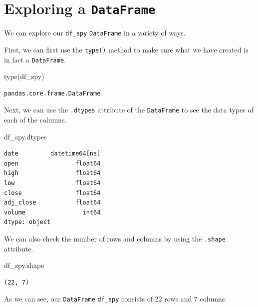 \documentclass[
  letterpaper,
  DIV=11,
  numbers=noendperiod]{scrreprt}
\newenvironment{Shaded}{\begin{snugshade}}{\end{snugshade}}
\newcommand{\BuiltInTok}[1]{\textcolor[rgb]{0.00,0.23,0.31}{#1}}
\newcommand{\NormalTok}[1]{\textcolor[rgb]{0.00,0.23,0.31}{#1}}
\begin{document}
\hypertarget{exploring-a-dataframe}{%
\section{\texorpdfstring{Exploring a
\texttt{DataFrame}}{Exploring a DataFrame}}\label{exploring-a-dataframe}}

We can explore our \texttt{df\_spy} \texttt{DataFrame} in a variety of
ways.

First, we can first use the \texttt{type()} method to make sure what we
have created is in fact a \texttt{DataFrame}.

\begin{Shaded}
\begin{Highlighting}[]
\BuiltInTok{type}\NormalTok{(df\_spy)}
\end{Highlighting}
\end{Shaded}

\begin{verbatim}
pandas.core.frame.DataFrame
\end{verbatim}

Next, we can use the \texttt{.dtypes} attribute of the
\texttt{DataFrame} to see the data types of each of the columns.

\begin{Shaded}
\begin{Highlighting}[]
\NormalTok{df\_spy.dtypes}
\end{Highlighting}
\end{Shaded}

\begin{verbatim}
date         datetime64[ns]
open                float64
high                float64
low                 float64
close               float64
adj_close           float64
volume                int64
dtype: object
\end{verbatim}

We can also check the number of rows and columns by using the
\texttt{.shape} attribute.

\begin{Shaded}
\begin{Highlighting}[]
\NormalTok{df\_spy.shape}
\end{Highlighting}
\end{Shaded}

\begin{verbatim}
(22, 7)
\end{verbatim}

As we can see, our \texttt{DataFrame} \texttt{df\_spy} consists of 22
rows and 7 columns.
\end{document}
